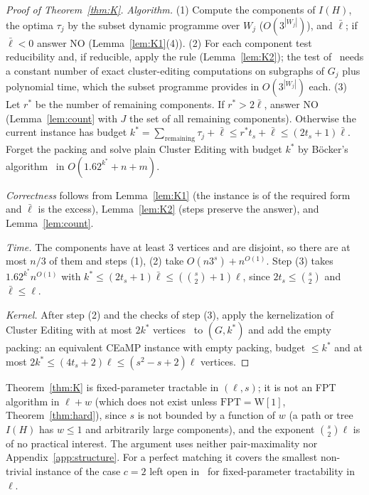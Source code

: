\begin{proof}[Proof of Theorem~\ref{thm:K}]
\emph{Algorithm.} (1) Compute the components of $I(H)$, the optima $\tau_j$ by the subset dynamic programme over $W_j$ ($O(3^{|W_j|})$), and $\bar\ell$; if $\bar\ell<0$ answer NO (Lemma~\ref{lem:K1}(4)). (2) For each component test reducibility and, if reducible, apply the rule (Lemma~\ref{lem:K2}); the test of~\cite[Lemma~6.4]{BFK18} needs a constant number of exact cluster-editing computations on subgraphs of $G_j$ plus polynomial time, which the subset programme provides in $O(3^{|W_j|})$ each. (3) Let $r^*$ be the number of remaining components. If $r^*>2\bar\ell$, answer NO (Lemma~\ref{lem:count} with $J$ the set of all remaining components). Otherwise the current instance has budget $k^*=\sum_{\text{remaining}}\tau_j+\bar\ell\le r^*t_s+\bar\ell\le(2t_s+1)\bar\ell$. Forget the packing and solve plain Cluster Editing with budget $k^*$ by B\"ocker's algorithm~\cite{Boe12} in $O(1.62^{k^*}+n+m)$.

\emph{Correctness} follows from Lemma~\ref{lem:K1} (the instance is of the required form and $\bar\ell$ is the excess), Lemma~\ref{lem:K2} (steps preserve the answer), and Lemma~\ref{lem:count}.

\emph{Time.} The components have at least $3$ vertices and are disjoint, so there are at most $n/3$ of them and steps (1), (2) take $O(n3^s)+n^{O(1)}$. Step (3) takes $1.62^{k^*}n^{O(1)}$ with $k^*\le(2t_s+1)\bar\ell\le(\binom s2+1)\ell$, since $2t_s\le\binom s2$ and $\bar\ell\le\ell$.

\emph{Kernel.} After step (2) and the checks of step (3), apply the kernelization of Cluster Editing with at most $2k^*$ vertices~\cite{CM12} to $(G,k^*)$ and add the empty packing: an equivalent CEaMP instance with empty packing, budget $\le k^*$ and at most $2k^*\le(4t_s+2)\ell\le(s^2-s+2)\ell$ vertices.
\end{proof}

\begin{remark}[Scope]
Theorem~\ref{thm:K} is fixed-parameter tractable in $(\ell,s)$; it is not an FPT algorithm in $\ell+w$ (which does not exist unless $\mathrm{FPT}=\mathrm{W[1]}$, Theorem~\ref{thm:hard}), since $s$ is not bounded by a function of $w$ (a path or tree $I(H)$ has $w\le1$ and arbitrarily large components), and the exponent $\binom s2\ell$ is of no practical interest. The argument uses neither pair-maximality nor Appendix~\ref{app:structure}. For a perfect matching it covers the smallest non-trivial instance of the case $c=2$ left open in~\cite{LPS23} for fixed-parameter tractability in $\ell$.
\end{remark}

